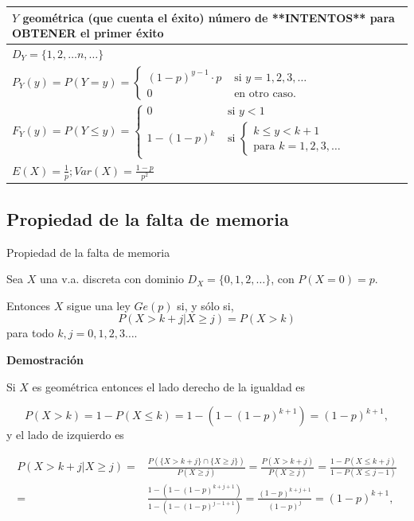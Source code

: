 \documentclass[
  letterpaper,
  DIV=11,
  numbers=noendperiod]{scrreprt}
\begin{document}
\renewcommand{\arraystretch}{1.75}
\begin{table}
\centering
\begin{tabular}{|l|}
\hline\rowcolor{LightBlue}
$Y$ geométrica (que cuenta el éxito) número de **INTENTOS** para OBTENER el primer éxito
\\\hline
$D_Y=\{1,2,\ldots n,\ldots\}$ \\\hline
$P_Y(y)=P(Y=y)=\left\{\begin{array}{ll}(1-p)^{y-1}\cdot p & \mbox{ si } y=1,2,3,\ldots\\ 0 & \mbox{ en otro caso.}\end{array}\right.$\\\hline
$F_Y(y)=P(Y\leq y)=\left\{\begin{array}{ll} 0 & \mbox{ si } y<1\\ 1- (1-p)^{k} & \mbox{ si } \left\{ \begin{array}{l}k\leq y< k+1\\\mbox{para } k=1,2,3,\dots \end{array} \right.\end{array}\right.$ \\\hline
$E(X)=\frac1{p}; Var(X)=\frac{1-p}{p^2}$
\\\hline
\end{tabular}
\end{table}

\subsection{Propiedad de la falta de
memoria}\label{propiedad-de-la-falta-de-memoria}

\begin{Proposicion}{Propiedad de la falta de memoria}{}

Sea \(X\) una v.a. discreta con dominio \(D_X=\{0,1,2,\ldots\}\), con
\(P(X=0)=p\).

Entonces \(X\) sigue una ley \(Ge(p)\) si, y sólo si, \[
P\left(X> k+j\big| X\geq j\right)=P(X> k)
\] para todo \(k,j=0,1,2,3\ldots\).

\end{Proposicion}

\textbf{Demostración}

Si \(X\) es geométrica entonces el lado derecho de la igualdad es

\[
P(X>k)=1-P(X\leq k)=1-\left(1-(1-p)^{k+1}\right)=(1-p)^{k+1},
\] y el lado de izquierdo es

\begin{align*}
P\left(X> k+j\big| X\geq j\right)=&\frac{P\left(\{X> k+j\}\cap \{X\geq j\} \right)}{P\left(X\geq j\right)}=
\frac{P\left(X>k+j \right)}{P\left(X\geq j \right)} = \frac{1-P(X\leq k+j)}{1-P(X\leq j-1)}\\
=& \frac{1-(1-(1-p)^{k+j+1})}{1-(1-(1-p)^{j-1+1})} =\frac{(1-p)^{k+j+1}}{(1-p)^{j}} = (1-p)^{k+1},
\end{align*}
\end{document}
